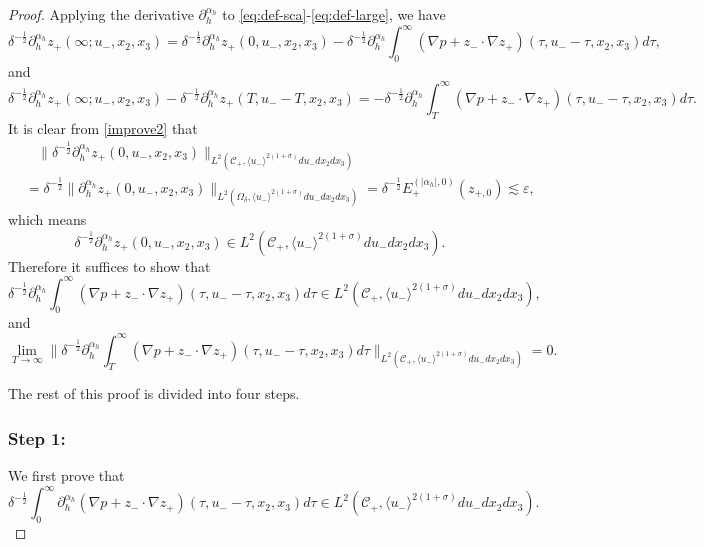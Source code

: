 \documentclass[10pt,reqno]{amsart}
\numberwithin{equation}{section}
\begin{document}
\begin{proof}
Applying the derivative $	\partial_h^{\alpha_h}$ to 	\eqref{eq:def-sca}-\eqref{eq:def-large}, we have 
	\begin{equation*}
		\delta^{-\frac{1}{2}}\partial_h^{\alpha_h} z_{+}(\infty;u_-,x_2,x_3)=\delta^{-\frac{1}{2}}\partial_h^{\alpha_h} z_{+}(0,u_-,x_2,x_3)-\delta^{-\frac{1}{2}}\partial_h^{\alpha_h}\int_0^{\infty} (\nabla p+z_{-}\cdot\nabla z_{+}) 
			(\tau,u_--\tau,x_2,x_3)d\tau,
	\end{equation*}
and
\begin{equation}\label{eq:lemma1-11'}
	\delta^{-\frac{1}{2}}\partial_h^{\alpha_h} z_{+}(\infty;u_-,x_2,x_3)-\delta^{-\frac{1}{2}}\partial_h^{\alpha_h} z_{+}(T,u_--T,x_2,x_3)=-\delta^{-\frac{1}{2}}\partial_h^{\alpha_h}\int_T^{\infty} (\nabla p+z_{-}\cdot\nabla z_{+}) 
	(\tau,u_--\tau,x_2,x_3)d\tau.
\end{equation}
It is clear from \eqref{improve2} that 
\begin{align*}
&\ \ \ \ 	\big\|\delta^{-\frac{1}{2}}\partial_h^{\alpha_h}z_+(0,u_-,x_2,x_3)\big\|_{L^2(\mathcal{C}_+,\langle u_-\rangle^{2(1+\sigma)}du_-dx_2dx_3)}\\
&	= \delta^{-\frac{1}{2}}\big\|\partial_h^{\alpha_h}z_+(0,u_-,x_2,x_3)\big\|_{L^2(\Omega_\delta,\langle u_-\rangle^{2(1+\sigma)}du_-dx_2dx_3)}
=\delta^{-\frac{1}{2}}E_+^{(|\alpha_h|,0)}(z_{+,0})
\lesssim  	\varepsilon,
\end{align*}
which means 
\begin{equation*}
\delta^{-\frac{1}{2}}\partial_h^{\alpha_h} z_{+}(0,u_-,x_2,x_3)\in L^2(\mathcal{C}_+,\langle u_-\rangle^{2(1+\sigma)}du_-dx_2dx_3).
\end{equation*}
Therefore it suffices to show that 
\begin{equation}\label{eq:lemma1-5}
\delta^{-\frac{1}{2}}\partial_h^{\alpha_h}\int_0^{\infty} (\nabla p+z_{-}\cdot\nabla z_{+}) 
(\tau,u_--\tau,x_2,x_3)d\tau\in L^2(\mathcal{C}_+,\langle u_-\rangle^{2(1+\sigma)}du_-dx_2dx_3),
\end{equation}
and 
\begin{equation}\label{eq:lemma1-5'}
	\lim_{T\to \infty}\Big\|\delta^{-\frac{1}{2}}\partial_h^{\alpha_h}\int_T^{\infty}  (\nabla p+z_{-}\cdot\nabla z_{+}) 
	(\tau,u_--\tau,x_2,x_3)d\tau\Big\|_{L^2(\mathcal{C}_+,\langle u_-\rangle^{2(1+\sigma)}du_-dx_2dx_3)}=0.
\end{equation}

The rest of this proof is divided into four steps. 

\subsubsection*{\bf Step 1:} We first prove that 
\begin{equation}\label{eq:lemma1-6}
\delta^{-\frac{1}{2}}\int_0^{\infty} \partial_h^{\alpha_h}(\nabla p+z_{-}\cdot\nabla z_{+}) 
(\tau,u_--\tau,x_2,x_3)d\tau\in L^2(\mathcal{C}_+,\langle u_-\rangle^{2(1+\sigma)}du_-dx_2dx_3).
\end{equation}



\end{proof}
\end{document}
